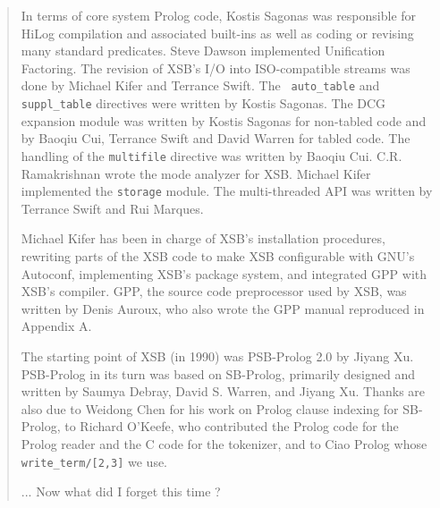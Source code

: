 \begin{quote}
In terms of core system Prolog code, Kostis Sagonas was responsible
for HiLog compilation and associated built-ins as well as coding or
revising many standard predicates.  Steve Dawson implemented
Unification Factoring.  The revision of XSB's I/O into ISO-compatible
streams was done by Michael Kifer and Terrance Swift.  The {\tt
  auto\_table} and {\tt suppl\_table} directives were written by
Kostis Sagonas.  The DCG expansion module was written by Kostis
Sagonas for non-tabled code and by Baoqiu Cui, Terrance Swift and
David Warren for tabled code.  The handling of the {\tt multifile}
directive was written by Baoqiu Cui. C.R. Ramakrishnan wrote the mode
analyzer for XSB.  Michael Kifer implemented the {\tt storage} module.
The multi-threaded API was written by Terrance Swift and Rui Marques.

Michael Kifer has been in charge of XSB's installation procedures,
rewriting parts of the XSB code to make XSB configurable with GNU's
Autoconf, implementing XSB's package system, and integrated GPP with
XSB's compiler.  GPP, the source code preprocessor used by XSB, was
written by Denis Auroux, who also wrote the GPP manual reproduced in
Appendix A.

The starting point of XSB (in 1990) was PSB-Prolog 2.0 by Jiyang Xu.
PSB-Prolog in its turn was based on SB-Prolog, primarily designed and
written by Saumya Debray, David S. Warren, and Jiyang Xu.  Thanks are
also due to Weidong Chen for his work on Prolog clause indexing for
SB-Prolog, to Richard O'Keefe, who contributed the Prolog code for the
Prolog reader and the C code for the tokenizer, and to Ciao Prolog
whose {\tt write\_term/[2,3]} we use.

... Now what did I forget this time ?

\end{quote}

